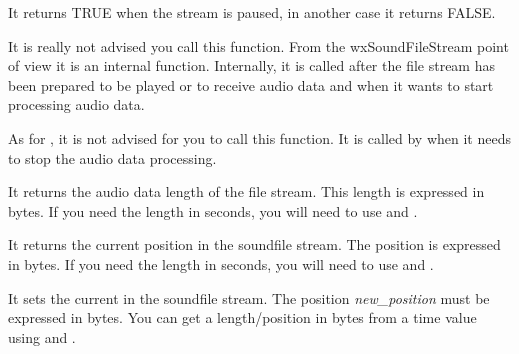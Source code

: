 \label{wxsoundfilestreamispaused}

It returns TRUE when the stream is paused, in another case it returns
FALSE.

\label{wxsoundfilestreamstartproduction}

It is really not advised you call this function. From the wxSoundFileStream
point of view it is an internal function. Internally, it is called after
the file stream has been prepared to be played or to receive audio data and 
when it wants to start processing audio data.

\label{wxsoundfilestreamstopproduction}

As for , it is not
advised for you to call this function. It is called by
 when it needs to stop the audio data
processing.

\label{wxsoundfilestreamgetlength}

It returns the audio data length of the file stream. This length is expressed
in bytes. If you need the length in seconds, you will need to use
 and
.

\label{wxsoundfilestreamgetposition}

It returns the current position in the soundfile stream. The position
is expressed in bytes. If you need the length in seconds, you will need to use
 and
.

\label{wxsoundfilestreamsetposition}

It sets the current in the soundfile stream. The position
 {\it new\_position} must be expressed in bytes. You can get
a length/position in bytes from a time value using
 and 
.

